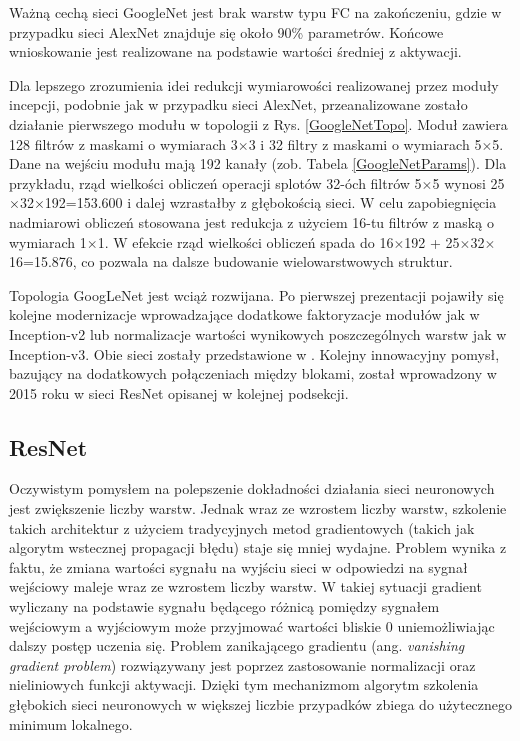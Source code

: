 Ważną cechą sieci GoogleNet jest brak warstw typu FC na zakończeniu, gdzie \linebreak w przypadku sieci AlexNet znajduje się około 90\% parametrów. Końcowe wnioskowanie jest realizowane na podstawie wartości średniej z aktywacji.

Dla lepszego zrozumienia idei redukcji wymiarowości realizowanej przez moduły incepcji, podobnie jak w przypadku sieci AlexNet, przeanalizowane zostało działanie pierwszego modułu w topologii z Rys. \ref{GoogleNetTopo}.
Moduł zawiera 128 filtrów z maskami \linebreak o wymiarach 3$\times$3 i 32 filtry z maskami o wymiarach 5$\times$5. Dane na wejściu modułu mają 192 kanały (zob. Tabela \ref{GoogleNetParams}). Dla przykładu, rząd wielkości obliczeń operacji splotów 32-óch filtrów 5$\times$5 wynosi 25$\times$32$\times$192=153.600 i dalej wzrastałby z głębokością sieci. W celu zapobiegnięcia nadmiarowi obliczeń stosowana jest redukcja \linebreak z użyciem 16-tu filtrów z maską o wymiarach 1$\times$1. W efekcie rząd wielkości obliczeń spada do 16$\times$192 +  25$\times$32$\times$16=15.876, co pozwala na dalsze budowanie wielowarstwowych struktur.

Topologia GoogLeNet jest wciąż rozwijana. Po pierwszej prezentacji pojawiły się kolejne modernizacje wprowadzające dodatkowe faktoryzacje modułów jak w Inception-v2 lub normalizacje wartości wynikowych poszczególnych warstw jak \linebreak w Inception-v3. Obie sieci zostały przedstawione w \cite{DBLP:journals/corr/SzegedyVISW15}. Kolejny innowacyjny pomysł, bazujący na dodatkowych połączeniach między blokami, został wprowadzony w 2015 roku w sieci ResNet opisanej w kolejnej podsekcji.

\subsection{ResNet}
\label{resnet}
Oczywistym pomysłem na polepszenie dokładności działania sieci neuronowych jest zwiększenie liczby warstw. Jednak wraz ze wzrostem liczby warstw, szkolenie takich architektur z użyciem tradycyjnych metod gradientowych (takich jak algorytm wstecznej propagacji błędu) staje się mniej wydajne. Problem wynika z faktu, że zmiana wartości sygnału na wyjściu sieci w odpowiedzi na sygnał wejściowy maleje wraz ze wzrostem liczby warstw. W takiej sytuacji gradient wyliczany \linebreak na podstawie sygnału będącego różnicą pomiędzy sygnałem wejściowym a wyjściowym może przyjmować wartości bliskie 0 uniemożliwiając dalszy postęp uczenia się. Problem zanikającego gradientu (ang. \textit{vanishing gradient problem}) rozwiązywany jest poprzez zastosowanie normalizacji oraz nieliniowych funkcji aktywacji. Dzięki tym mechanizmom algorytm szkolenia głębokich sieci neuronowych w większej liczbie przypadków zbiega do użytecznego minimum lokalnego. 

